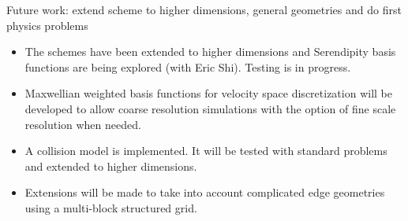 \documentclass[pdf]{beamer}
\theoremstyle{definition}
\begin{document}
\begin{frame}{Future work: extend scheme to higher dimensions, general
    geometries and do first physics problems}%

  \begin{itemize}
    \small
  \item The schemes have been extended to higher dimensions and
    Serendipity basis functions are being explored (with Eric
    Shi). Testing is in progress.
  \item Maxwellian weighted basis functions for velocity space
    discretization will be developed to allow coarse resolution
    simulations with the option of fine scale resolution when needed.
  \item A collision model is implemented. It will be tested with
    standard problems and extended to higher dimensions.
  \item Extensions will be made to take into account complicated edge
    geometries using a multi-block structured grid.
  \end{itemize}
\end{frame}
\end{document}
